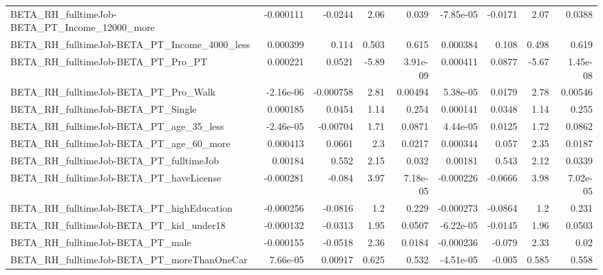 \begin{tabular}{lrrrrrrrr}
BETA\_RH\_fulltimeJob-BETA\_PT\_Income\_12000\_more      &   -0.000111 &      -0.0244 &      2.06 &    0.039 &  -7.85e-05 &     -0.0171 &         2.07 &        0.0388 \\
BETA\_RH\_fulltimeJob-BETA\_PT\_Income\_4000\_less       &    0.000399 &        0.114 &     0.503 &    0.615 &   0.000384 &       0.108 &        0.498 &         0.619 \\
BETA\_RH\_fulltimeJob-BETA\_PT\_Pro\_PT                 &    0.000221 &       0.0521 &     -5.89 & 3.91e-09 &   0.000411 &      0.0877 &        -5.67 &      1.45e-08 \\
BETA\_RH\_fulltimeJob-BETA\_PT\_Pro\_Walk               &   -2.16e-06 &    -0.000758 &      2.81 &  0.00494 &   5.38e-05 &      0.0179 &         2.78 &       0.00546 \\
BETA\_RH\_fulltimeJob-BETA\_PT\_Single                 &    0.000185 &       0.0454 &      1.14 &    0.254 &   0.000141 &      0.0348 &         1.14 &         0.255 \\
BETA\_RH\_fulltimeJob-BETA\_PT\_age\_35\_less            &   -2.46e-05 &     -0.00704 &      1.71 &   0.0871 &   4.44e-05 &      0.0125 &         1.72 &        0.0862 \\
BETA\_RH\_fulltimeJob-BETA\_PT\_age\_60\_more            &    0.000413 &       0.0661 &       2.3 &   0.0217 &   0.000344 &       0.057 &         2.35 &        0.0187 \\
BETA\_RH\_fulltimeJob-BETA\_PT\_fulltimeJob            &     0.00184 &        0.552 &      2.15 &    0.032 &    0.00181 &       0.543 &         2.12 &        0.0339 \\
BETA\_RH\_fulltimeJob-BETA\_PT\_haveLicense            &   -0.000281 &       -0.084 &      3.97 & 7.18e-05 &  -0.000226 &     -0.0666 &         3.98 &      7.02e-05 \\
BETA\_RH\_fulltimeJob-BETA\_PT\_highEducation          &   -0.000256 &      -0.0816 &       1.2 &    0.229 &  -0.000273 &     -0.0864 &          1.2 &         0.231 \\
BETA\_RH\_fulltimeJob-BETA\_PT\_kid\_under18            &   -0.000132 &      -0.0313 &      1.95 &   0.0507 &  -6.22e-05 &     -0.0145 &         1.96 &        0.0503 \\
BETA\_RH\_fulltimeJob-BETA\_PT\_male                   &   -0.000155 &      -0.0518 &      2.36 &   0.0184 &  -0.000236 &      -0.079 &         2.33 &          0.02 \\
BETA\_RH\_fulltimeJob-BETA\_PT\_moreThanOneCar         &    7.66e-05 &      0.00917 &     0.625 &    0.532 &  -4.51e-05 &      -0.005 &        0.585 &         0.558 \\

\end{tabular}
